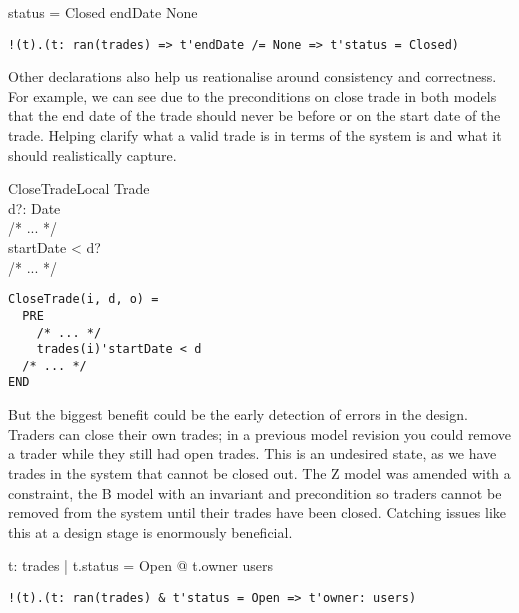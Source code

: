 \documentclass{article}
\begin{document}
\begin{zed}
status = Closed \implies endDate \neq None \\
\end{zed}

\begin{verbatim}
!(t).(t: ran(trades) => t'endDate /= None => t'status = Closed)
\end{verbatim}
  
\hspace{-0.68cm} Other declarations also help us reationalise around consistency and correctness. For example, we can see due to the preconditions on close trade in both models that the end date of the trade should never be before or on the start date of the trade. Helping clarify what a valid trade is in terms of the system is and what it should realistically capture. 

\begin{schema}{CloseTradeLocal}
\Delta Trade \\
d?: Date \\ 
/* ... */ \\
\where  
startDate < d? \\
/* ... */ \\
\end{schema}

\begin{verbatim}
CloseTrade(i, d, o) =
  PRE
    /* ... */
    trades(i)'startDate < d
  /* ... */
END 
\end{verbatim}

\hspace{-0.68cm} But the biggest benefit could be the early detection of errors in the design. Traders can close their own trades; in a previous model revision you could remove a trader while they still had open trades. This is an undesired state, as we have trades in the system that cannot be closed out. The Z model was amended with a constraint, the B model with an invariant and precondition so traders cannot be removed from the system until their trades have been closed. Catching issues like this at a design stage is enormously beneficial.

\begin{zed}
\forall t: \ran trades | t.status = Open @ t.owner \in users \\ 
\end{zed}

\begin{verbatim}
!(t).(t: ran(trades) & t'status = Open => t'owner: users)
\end{verbatim}
\end{document}
